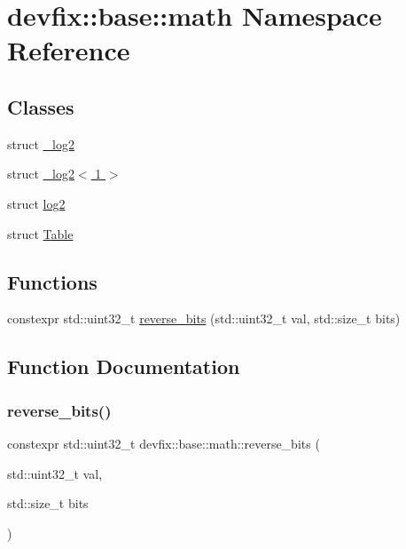 \hypertarget{namespacedevfix_1_1base_1_1math}{}\section{devfix\+:\+:base\+:\+:math Namespace Reference}
\label{namespacedevfix_1_1base_1_1math}
\subsection*{Classes}
\begin{DoxyCompactItemize}
\item 
struct \hyperlink{structdevfix_1_1base_1_1math_1_1__log2}{\+\_\+log2}
\item 
struct \hyperlink{structdevfix_1_1base_1_1math_1_1__log2_3_011_01_4}{\+\_\+log2$<$ 1 $>$}
\item 
struct \hyperlink{structdevfix_1_1base_1_1math_1_1log2}{log2}
\item 
struct \hyperlink{structdevfix_1_1base_1_1math_1_1Table}{Table}
\end{DoxyCompactItemize}
\subsection*{Functions}
\begin{DoxyCompactItemize}
\item 
constexpr std\+::uint32\+\_\+t \hyperlink{namespacedevfix_1_1base_1_1math_a9c04441c569b58ce06eb743f1be7c6f1}{reverse\+\_\+bits} (std\+::uint32\+\_\+t val, std\+::size\+\_\+t bits)
\end{DoxyCompactItemize}


\subsection{Function Documentation}
\mbox{\label{namespacedevfix_1_1base_1_1math_a9c04441c569b58ce06eb743f1be7c6f1}} 
\subsubsection{\texorpdfstring{reverse\+\_\+bits()}{reverse\_bits()}}
{\footnotesize\ttfamily constexpr std\+::uint32\+\_\+t devfix\+::base\+::math\+::reverse\+\_\+bits (\begin{DoxyParamCaption}\item[{std\+::uint32\+\_\+t}]{val,  }\item[{std\+::size\+\_\+t}]{bits }\end{DoxyParamCaption})}

